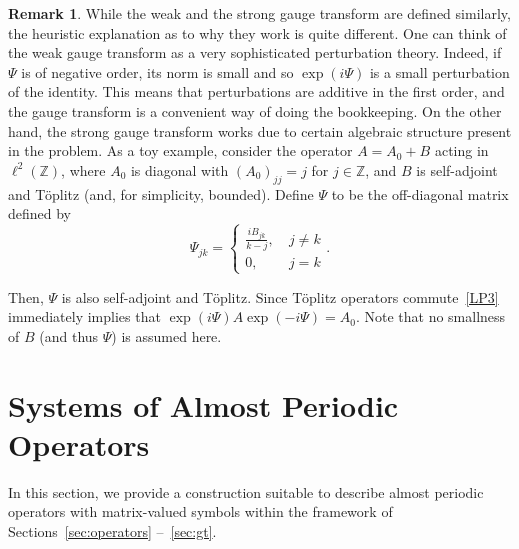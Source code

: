 \documentclass[10pt]{amsart}
\theoremstyle{definition}\newtheorem{defi}[theo]{Definition}\newtheorem{rema}[theo]{Remark}\newtheorem{exam}[theo]{Example}\newtheorem{nota}[theo]{Notation}
\newcommand{\Z}{\mathbb Z}
\begin{document}
\begin{rema}
While the weak and the strong gauge transform are defined similarly, the heuristic explanation as to why they work is quite different. One can think of the weak gauge transform as a very sophisticated perturbation theory. Indeed, if $\Psi$ is of negative order, its norm is small and so $\exp(i\Psi)$ is a small perturbation of the identity. This means that perturbations are additive in the first order, and the gauge transform is a convenient way of doing the bookkeeping. On the other hand, the strong gauge transform works due to certain algebraic structure present in the problem. As a toy example, consider the operator $A=A_0+B$ acting in $\ell^2(\Z)$, where $A_0$ is diagonal with $(A_0)_{jj}=j$ for $j\in\Z$, and $B$ is self-adjoint and T\"oplitz (and, for simplicity, bounded). Define $\Psi$ to be the off-diagonal matrix defined by
\[
\Psi_{jk}=
\begin{cases}\frac{iB_{jk}}{k - j},& \ j \ne k\\
0,& \ j= k
\end{cases}.
\]

Then, $\Psi$ is also self-adjoint and T\"oplitz. Since T\"oplitz operators commute~\eqref{LP3} immediately implies that $\exp(i\Psi)A\exp(-i\Psi)=A_0$. Note that no smallness of $B$ (and thus $\Psi$) is assumed here.
\end{rema}

\section{Systems of Almost Periodic Operators} \label{sec:mapo}

In this section, we provide a construction suitable to describe almost periodic operators with matrix-valued symbols within the framework of Sections~\ref{sec:operators} --~\ref{sec:gt}.
\end{document}
